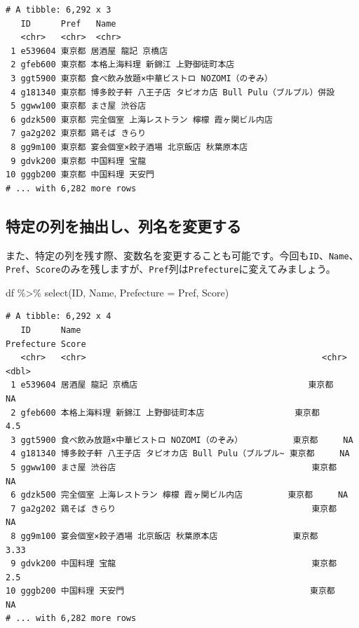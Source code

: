\documentclass[
  a4paper,
  pandoc,
  ja=standard,
  jafont=haranoaji]{bxjsbook}
\newenvironment{Shaded}{\begin{snugshade}}{\end{snugshade}}
\newcommand{\AttributeTok}[1]{\textcolor[rgb]{0.00,0.48,0.65}{#1}}
\newcommand{\FunctionTok}[1]{\textcolor[rgb]{0.28,0.35,0.67}{#1}}
\newcommand{\NormalTok}[1]{\textcolor[rgb]{0.00,0.48,0.65}{#1}}
\newcommand{\SpecialCharTok}[1]{\textcolor[rgb]{0.37,0.37,0.37}{#1}}
\begin{document}
\begin{verbatim}
# A tibble: 6,292 x 3
   ID      Pref   Name                                                    
   <chr>   <chr>  <chr>                                                   
 1 e539604 東京都 居酒屋 龍記 京橋店                                      
 2 gfeb600 東京都 本格上海料理 新錦江 上野御徒町本店                      
 3 ggt5900 東京都 食べ飲み放題×中華ビストロ NOZOMI（のぞみ）              
 4 g181340 東京都 博多餃子軒 八王子店 タピオカ店 Bull Pulu（ブルプル）併設
 5 ggww100 東京都 まさ屋 渋谷店                                           
 6 gdzk500 東京都 完全個室 上海レストラン 檸檬 霞ヶ関ビル内店             
 7 ga2g202 東京都 鶏そば きらり                                           
 8 gg9m100 東京都 宴会個室×餃子酒場 北京飯店 秋葉原本店                   
 9 gdvk200 東京都 中国料理 宝龍                                           
10 gggb200 東京都 中国料理 天安門                                         
# ... with 6,282 more rows
\end{verbatim}

\hypertarget{ux7279ux5b9aux306eux5217ux3092ux62bdux51faux3057ux5217ux540dux3092ux5909ux66f4ux3059ux308b}{%
\subsection{特定の列を抽出し、列名を変更する}\label{ux7279ux5b9aux306eux5217ux3092ux62bdux51faux3057ux5217ux540dux3092ux5909ux66f4ux3059ux308b}}

また、特定の列を残す際、変数名を変更することも可能です。今回も\texttt{ID}、\texttt{Name}、\texttt{Pref}、\texttt{Score}のみを残しますが、\texttt{Pref}列は\texttt{Prefecture}に変えてみましょう。

\begin{Shaded}
\begin{Highlighting}[numbers=left,,]
\NormalTok{df }\SpecialCharTok{\%\textgreater{}\%}
  \FunctionTok{select}\NormalTok{(ID, Name, }\AttributeTok{Prefecture =}\NormalTok{ Pref, Score)}
\end{Highlighting}
\end{Shaded}

\begin{verbatim}
# A tibble: 6,292 x 4
   ID      Name                                                Prefecture Score
   <chr>   <chr>                                               <chr>      <dbl>
 1 e539604 居酒屋 龍記 京橋店                                  東京都     NA   
 2 gfeb600 本格上海料理 新錦江 上野御徒町本店                  東京都      4.5 
 3 ggt5900 食べ飲み放題×中華ビストロ NOZOMI（のぞみ）          東京都     NA   
 4 g181340 博多餃子軒 八王子店 タピオカ店 Bull Pulu（ブルプル~ 東京都     NA   
 5 ggww100 まさ屋 渋谷店                                       東京都     NA   
 6 gdzk500 完全個室 上海レストラン 檸檬 霞ヶ関ビル内店         東京都     NA   
 7 ga2g202 鶏そば きらり                                       東京都     NA   
 8 gg9m100 宴会個室×餃子酒場 北京飯店 秋葉原本店               東京都      3.33
 9 gdvk200 中国料理 宝龍                                       東京都      2.5 
10 gggb200 中国料理 天安門                                     東京都     NA   
# ... with 6,282 more rows
\end{verbatim}
\end{document}
